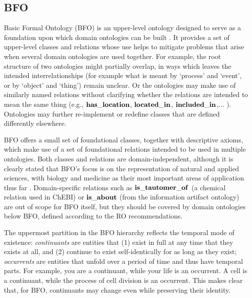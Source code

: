 \subsection*{BFO}

Basic Formal Ontology (BFO) is an upper-level ontology designed to serve as a foundation upon which domain ontologies can be built \cite{BFO2:Graz}. It provides a set of upper-level classes and relations whose use helps to mitigate problems that arise when several domain ontologies are used together.
For example, the root structure of two ontologies might partially overlap, in ways which leaves the intended interrelationships (for example what is meant by `process' and `event', or by `object' and `thing') remain unclear. 
Or the ontologies may make use of similarly named relations without clarifying whether the relations are intended to mean the same thing 
(e.g., $\mathrm{\mathbf{has\_location}}$, $\mathrm{\mathbf{located\_in}}$, $\mathrm{\mathbf{included\_in}}$,... ). Ontologies may further re-implement or redefine classes that are defined differently elsewhere.

BFO offers a small set of foundational classes, together with descriptive axioms, which make use of a set of foundational relations
intended to be used in multiple ontologies. Both classes and relations are domain-independent, although it is clearly stated that BFO's focus is on the representation of natural and applied sciences, with biology and medicine as their most important areas of application thus far .   
Domain-specific relations such as $\mathrm{\mathbf{is\_tautomer\_of}}$ (a chemical relation used in ChEBI) or $\mathrm{\mathbf{is\_about}}$ (from the information artifact ontology) are out of scope for BFO itself, but they should be covered by domain ontologies below BFO, defined according to the RO recommendations.  

The uppermost partition in the BFO hierarchy reflects the temporal mode of existence: \textit{continuants} are entities that (1) exist in full at any time that they exists at all, and (2) continue to exist self-identically for as long as they exist; \textit{occurrents} are entities that unfold over a period of time and thus have temporal parts. For example, you are a continuant, while your life is an occurrent.  A cell is a continuant, while the process of cell division is an occurrent. This makes clear that, for BFO, continuants may change even while preserving their identity. 

